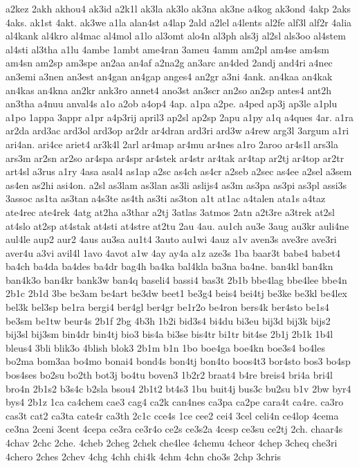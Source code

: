 {a2kez
2akh
akhou4
ak3id
a2k1l
ak3la
ak3lo
ak3na
ak3ne
a4kog
ak3ond
4akp
2aks
4aks.
ak1st
4akt.
ak3we
a1la
alan4st
a4lap
2ald
a2lel
a4lents
al2fe
alf3l
alf2r
4alia
al4kank
al4kro
al4mac
al4mol
a1lo
al3omt
alo4n
al3ph
als3j
al2sl
als3oo
al4stem
al4sti
al3tha
a1lu
4ambe
1ambt
ame4ran
3ameu
4amm
am2pl
am4se
am4sm
am4sn
am2sp
am3spe
an2aa
an4af
a2na2g
an3arc
an4ded
2andj
and4ri
a4nec
an3emi
a3nen
an3est
an4gan
an4gap
anges4
an2gr
a3ni
4ank.
an4kaa
an4kak
an4kas
an4kna
an2kr
ank3ro
annet4
ano3st
an3scr
an2so
an2sp
antes4
ant2h
an3tha
a4nuu
anval4s
a1o
a2ob
a4op4
4ap.
a1pa
a2pe.
a4ped
ap3j
ap3le
a1plu
a1po
1appa
3appr
a1pr
a4p3rij
april3
ap2sl
ap2sp
2apu
a1py
a1q
a4ques
4ar.
a1ra
ar2da
ard3ac
ard3ol
ard3op
ar2dr
ar4dran
ard3ri
ard3w
a4rew
arg3l
3argum
a1ri
ari4an.
ari4ce
ariet4
ar3k4l
2arl
ar4map
ar4mu
ar4nes
a1ro
2aroo
ar4s1l
ars3la
ars3m
ar2sn
ar2so
ar4spa
ar4spr
ar4stek
ar4str
ar4tak
ar4tap
ar2tj
ar4top
ar2tr
art4sl
a3rus
a1ry
4asa
asal4
as1ap
a2sc
as4ch
as4cr
a2seb
a2sec
as4ee
a2sel
a3sem
as4en
as2hi
asi4on.
a2sl
as3lam
as3lan
as3li
aslijs4
as3m
as3pa
as3pi
as3pl
assi3s
3assoc
as1ta
as3tan
a4s3te
as4th
as3ti
as3ton
a1t
at1ac
a4talen
ata1s
a4taz
ate4rec
ate4rek
4atg
at2ha
a3thar
a2tj
3atlas
3atmos
2atn
a2t3re
a3trek
at2sl
at4slo
at2sp
at4stak
at4sti
at4stre
at2tu
2au
4au.
au1ch
au3e
3aug
au3kr
auli4ne
aul4le
aup2
aur2
4aus
au3sa
au1t4
3auto
au1wi
4auz
a1v
aven3s
ave3re
ave3ri
aver4u
a3vi
avil4l
1avo
4avot
a1w
4ay
ay4a
a1z
aze3s
1ba
baar3t
babe4
babet4
ba4ch
ba4da
ba4des
ba4dr
bag4h
ba4ka
bal4kla
ba3na
ba4ne.
ban4kl
ban4kn
ban4k3o
ban4kr
bank3w
ban4q
baseli4
bassi4
bas3t
2b1b
bbe4lag
bbe4lee
bbe4n
2b1c
2b1d
3be
be3am
be4art
be3dw
beet1
be3g4
beis4
bei4tj
be3ke
be3kl
be4lex
bel3k
bel3sp
be1ra
bergi4
ber4gl
ber4gr
be1r2o
be4ron
bers4k
ber4sto
be1s4
be3sm
be1tw
beur4s
2b1f
2bg
4b3h
1b2i
bid3s4
bi4du
bi3eu
bij3d
bij3k
bijs2
bij3sl
bij3sm
bin4dr
bin4tj
bio3
bis4a
bi3se
bis4tr
bi1tr
bit4se
2b1j
2b1k
1b4l
bleus4
3bli
blik3o
4blish
blok3
2b1m
b1n
1bo
boe4ga
boe4kn
boe3s4
bo4les
bo2ma
bom3aa
bo4mo
bonai4
bond4s
bon4tj
bon4to
boos4t3
bor4sto
bos3
bo4sp
bos4ses
bo2su
bo2th
bot3j
bo4tu
boven3
1b2r2
braat4
b4re
breis4
bri4a
bri4l
bro4n
2b1s2
b3s4c
b2sla
bsou4
2b1t2
bt4s3
1bu
buit4j
bus3c
bu2su
b1v
2bw
byr4
bys4
2b1z
1ca
ca4chem
cae3
cag4
ca2k
can4nes
ca3pa
ca2pe
cara4t
ca4re.
ca3ro
cas3t
cat2
ca3ta
cate4r
ca3th
2c1c
cce4s
1ce
cee2
cei4
3cel
celi4n
ce4lop
4cema
ce3na
2ceni
3cent
4cepa
ce3ra
ce3r4o
ce2s
ce3s2a
4cesp
ce3su
ce2tj
2ch.
chaar4s
4chav
2chc
2che.
4cheb
2cheg
2chek
che4lee
4chemu
4cheor
4chep
3cheq
che3ri
4chero
2ches
2chev
4chg
4chh
chi4k
4chm
4chn
cho3s
2chp
3chris
}
